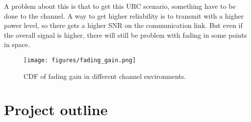 A problem about this is that to get this URC scenario, something have to be done to the channel. A way to get higher reliability is to transmit with a higher power level, so there gets a higher \gls{SNR} on the communication link. But even if the overall signal is higher, there will still be problem with fading in some points in space. 


\begin{figure}[H]
\centering
\texttt{[image: figures/fading\_gain.png]}
\caption{\gls{CDF} of fading gain in different channel environments.}
\label{fading_gain}
\end{figure}


\section{Project outline}





